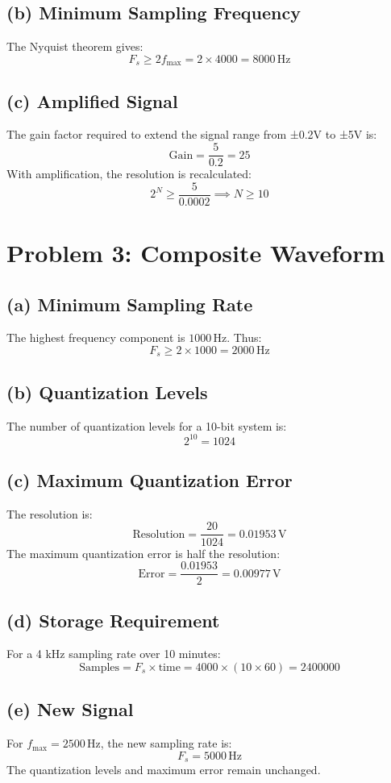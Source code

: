 \documentclass[12pt]{article}
\begin{document}
\subsection*{(b) Minimum Sampling Frequency}
The Nyquist theorem gives:
\[
F_s \geq 2f_{\text{max}} = 2 \times 4000 = 8000 \, \text{Hz}
\]

\subsection*{(c) Amplified Signal}
The gain factor required to extend the signal range from ±0.2V to ±5V is:
\[
\text{Gain} = \frac{5}{0.2} = 25
\]
With amplification, the resolution is recalculated:
\[
2^N \geq \frac{5}{0.0002} \implies N \geq 10
\]

\section{Problem 3: Composite Waveform}
\subsection*{(a) Minimum Sampling Rate}
The highest frequency component is \(1000 \, \text{Hz}\). Thus:
\[
F_s \geq 2 \times 1000 = 2000 \, \text{Hz}
\]

\subsection*{(b) Quantization Levels}
The number of quantization levels for a 10-bit system is:
\[
2^{10} = 1024
\]

\subsection*{(c) Maximum Quantization Error}
The resolution is:
\[
\text{Resolution} = \frac{20}{1024} = 0.01953 \, \text{V}
\]
The maximum quantization error is half the resolution:
\[
\text{Error} = \frac{0.01953}{2} = 0.00977 \, \text{V}
\]

\subsection*{(d) Storage Requirement}
For a 4 kHz sampling rate over 10 minutes:
\[
\text{Samples} = F_s \times \text{time} = 4000 \times (10 \times 60) = 2400000
\]

\subsection*{(e) New Signal}
For \(f_{\text{max}} = 2500 \, \text{Hz}\), the new sampling rate is:
\[
F_s = 5000 \, \text{Hz}
\]
The quantization levels and maximum error remain unchanged.
\end{document}
